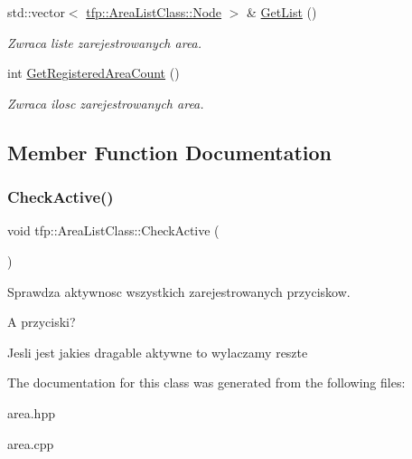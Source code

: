 \begin{DoxyCompactItemize}
\mbox{\label{classtfp_1_1_area_list_class_a807ceddb8e2e6b6e9a6ac357e54a6146}} 
std\+::vector$<$ \mbox{\hyperlink{structtfp_1_1_area_list_class_1_1_node}{tfp\+::\+Area\+List\+Class\+::\+Node}} $>$ \& \mbox{\hyperlink{classtfp_1_1_area_list_class_a807ceddb8e2e6b6e9a6ac357e54a6146}{Get\+List}} ()
\begin{DoxyCompactList}\small\item\em Zwraca liste zarejestrowanych area. \end{DoxyCompactList}\item 
\mbox{\label{classtfp_1_1_area_list_class_af45964e5d51eee5ad7933408c843e468}} 
int \mbox{\hyperlink{classtfp_1_1_area_list_class_af45964e5d51eee5ad7933408c843e468}{Get\+Registered\+Area\+Count}} ()
\begin{DoxyCompactList}\small\item\em Zwraca ilosc zarejestrowanych area. \end{DoxyCompactList}\end{DoxyCompactItemize}


\subsection{Member Function Documentation}
\mbox{\label{classtfp_1_1_area_list_class_a3c71f74eefdaa9751bcbe185899f905b}} 
\subsubsection{\texorpdfstring{Check\+Active()}{CheckActive()}}
{\footnotesize\ttfamily void tfp\+::\+Area\+List\+Class\+::\+Check\+Active (\begin{DoxyParamCaption}{ }\end{DoxyParamCaption})}



Sprawdza aktywnosc wszystkich zarejestrowanych przyciskow. 

A przyciski?

Jesli jest jakies dragable aktywne to wylaczamy reszte 

The documentation for this class was generated from the following files\+:\begin{DoxyCompactItemize}
\item 
area.\+hpp\item 
area.\+cpp\end{DoxyCompactItemize}
